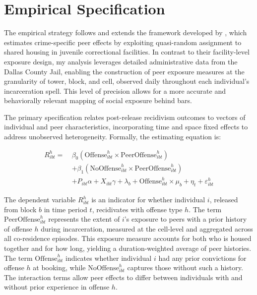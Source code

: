 \documentclass[12pt, a4paper]{article}
\begin{document}
\section{Empirical Specification}

The empirical strategy follows and extends the framework developed by \citet{bayer2009building}, which estimates crime-specific peer effects by exploiting quasi-random assignment to shared housing in juvenile correctional facilities. In contrast to their facility-level exposure design, my analysis leverages detailed administrative data from the Dallas County Jail, enabling the construction of peer exposure measures at the granularity of tower, block, and cell, observed daily throughout each individual's incarceration spell. This level of precision allows for a more accurate and behaviorally relevant mapping of social exposure behind bars.

The primary specification relates post-release recidivism outcomes to vectors of individual and peer characteristics, incorporating time and space fixed effects to address unobserved heterogeneity. Formally, the estimating equation is:

\begin{align}
    R_{ibt}^{h} =\ & \beta_{0} \left( \text{Offense}_{ibt}^{h} \times \text{PeerOffense}_{ibt}^{h} \right) \nonumber \\
    & + \beta_{1} \left( \text{NoOffense}_{ibt}^{h} \times \text{PeerOffense}_{ibt}^{h} \right) \nonumber \\
    & + P_{ibt} \alpha + X_{ibt} \gamma + \lambda_{b} + \text{Offense}_{ibt}^{h} \times \mu_{b} + \eta_{t} + \varepsilon_{ibt}^{h}
    \end{align}
    

The dependent variable $R_{ibt}^{h}$ is an indicator for whether individual $i$, released from block $b$ in time period $t$, recidivates with offense type $h$. The term $\text{PeerOffense}_{ibt}^{h}$ represents the extent of $i$’s exposure to peers with a prior history of offense $h$ during incarceration, measured at the cell-level and aggregated across all co-residence episodes. This exposure measure accounts for both who is housed together and for how long, yielding a duration-weighted average of peer histories. The term $\text{Offense}_{ibt}^{h}$ indicates whether individual $i$ had any prior convictions for offense $h$ at booking, while $\text{NoOffense}_{ibt}^{h}$ captures those without such a history. The interaction terms allow peer effects to differ between individuals with and without prior experience in offense $h$.
\end{document}
